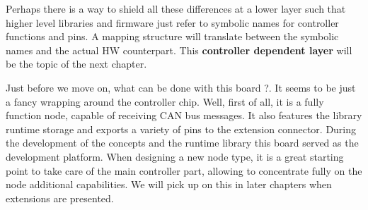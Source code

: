 Perhaps there is a way to shield all these differences at a lower layer such that higher level libraries and firmware just refer to symbolic names for controller functions and pins. A mapping structure will translate between the symbolic names and the actual HW counterpart. This \textbf{controller dependent layer} will be the topic of the next chapter.

Just before we move on, what can be done with this board ?. It seems to be just a fancy wrapping around the controller chip. Well, first of all, it is a fully function node, capable of receiving CAN bus messages. It also features the library runtime storage and exports a variety of pins to the extension connector. During the development of the concepts and the runtime library this board served as the development platform. When designing a new node type, it is a great starting point to take care of the main controller part, allowing to concentrate fully on the node additional capabilities. We will pick up on this in later chapters when extensions are presented.    
